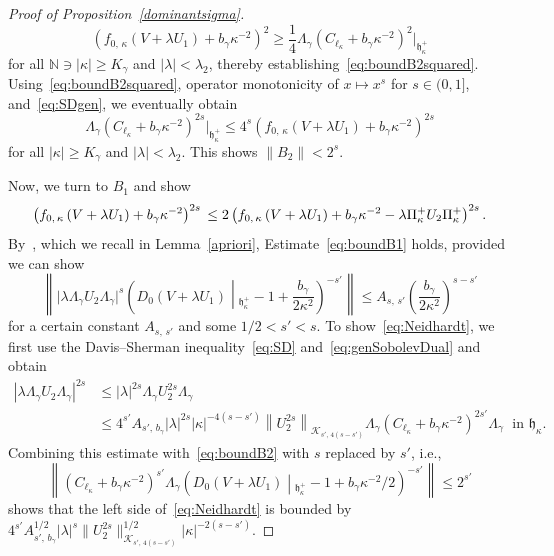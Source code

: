 \documentclass[AHL,Unicode,longabstracts,published]{cedram}
\newcommand*\nz{\mathbb{N}}
\newcommand*\cK{\mathcal{K}}
\newcommand*\gh{\mathfrak{h}}
\newcommand*\ghpk{{\gh^+_\kappa}}
\newcommand*\ppp{\Pi^+_\kappa}
\begin{document}
\begin{proof}[Proof of Proposition~\ref{dominantsigma}]
\begin{equation}
\left(f_{0,\,\kappa}\left(V+\lambda U_1\right)+b_\gamma\kappa^{-2}\right)^2
\geq \frac14 \Lambda_\gamma\left(C_{\ell_\kappa}+b_\gamma\kappa^{-2}\right)^2\big|_\ghpk
\end{equation}
for all $\nz\ni|\kappa|\geq K_\gamma$ and $|\lambda|<\lambda_2$, thereby establishing~\eqref{eq:boundB2squared}. Using~\eqref{eq:boundB2squared}, operator monotonicity of $x\mapsto x^s$ for $s\in(0,1]$, and~\eqref{eq:SDgen}, we eventually obtain
\begin{equation}\label{eq:boundB2}
\Lambda_\gamma\left(C_{\ell_\kappa}+b_\gamma\kappa^{-2}\right)^{2s}\big|_\ghpk
\leq 4^s\left(f_{0,\,\kappa}\left(V+\lambda U_1\right)+b_\gamma\kappa^{-2}\right)^{2s}
\end{equation}
for all $|\kappa|\geq K_\gamma$ and $|\lambda|<\lambda_2$. This shows $\|B_2\|<2^s$.

Now, we turn to $B_1$ and show
\begin{equation}\label{eq:boundB1}
\left(f_{0,\,\kappa}\left(V+\lambda U_1\right)+b_\gamma\kappa^{-2}\right)^{2s}\\
\leq 2\left(f_{0,\,\kappa}\left(V+\lambda U_1\right)+b_\gamma\kappa^{-2}-\lambda \ppp U_2\ppp\right)^{2s}.
\end{equation}
By~\cite[Lemma~3.4]{Franketal2020P}, which we recall in Lemma~\ref{apriori}, Estimate~\eqref{eq:boundB1} holds, provided we can show
\begin{equation}\label{eq:Neidhardt}
\left\|\big|\lambda \Lambda_\gamma U_2\Lambda_\gamma\big|^{s}\left(D_0(V+\lambda U_1)\middle|_{\ghpk}-1+\frac{b_\gamma}{2\kappa^2}\right)^{-s'}\right\|
\leq A_{s,\,s'}\left(\frac{b_\gamma}{2\kappa^2}\right)^{s-s'}
\end{equation}
for a certain constant $A_{s,\,s'}$ and some $1/2<s'<s$. To show~\eqref{eq:Neidhardt}, we first use the Davis--Sherman inequality~\eqref{eq:SD} and~\eqref{eq:genSobolevDual} and obtain
\begin{align*}
\left|\lambda \Lambda_\gamma U_2\Lambda_\gamma\right|^{2s}
&\leq |\lambda|^{2s} \Lambda_\gamma U_2^{2s}\Lambda_\gamma\\
&\leq 4^{s'}A_{s',\,b_\gamma} |\lambda|^{2s} |\kappa|^{-4(s-s')}\left\|U_2^{2s}\right\|_{\cK_{s',\,4\left(s-s'\right)}}\Lambda_\gamma\left(C_{\ell_\kappa}+b_\gamma\kappa^{-2}\right)^{2s'}\Lambda_\gamma
\;\text{ in } \gh_{\kappa}.
\end{align*}
Combining this estimate with~\eqref{eq:boundB2} with $s$ replaced by $s'$, i.e.,
\[
\left\|\left(C_{\ell_\kappa}+b_\gamma\kappa^{-2}\right)^{s'}\Lambda_\gamma\left(D_0\left(V+\lambda U_1\right)\middle|_\ghpk-1+b_\gamma\kappa^{-2}/2\right)^{-s'}\right\| \leq 2^{s'}
\]
shows that the left side of~\eqref{eq:Neidhardt} is bounded by $4^{s'}A_{s',\,b_\gamma}^{1/2}|\lambda|^s\|U_2^{2s}\|_{\cK_{s',\,4(s-s')}}^{1/2} |\kappa|^{-2(s-s')}$.


\end{proof}
\end{document}
